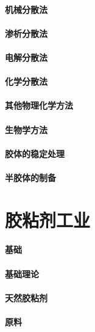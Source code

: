 \documentclass[UTF8]{../../ApplicationUniverse}
\begin{document}
            \subsubsection{机械分散法}
            \subsubsection{渗析分散法}
            \subsubsection{电解分散法}
            \subsubsection{化学分散法}
            \subsubsection{其他物理化学方法}
            \subsubsection{生物学方法}
        \subsubsection{胶体的稳定处理}
    \subsubsection{半胶体的制备}








\chapter{胶粘剂工业}
\subsubsection{基础}
    \subsubsection{基础理论}
    \subsubsection{天然胶粘剂}
    \subsubsection{原料}
\end{document}
